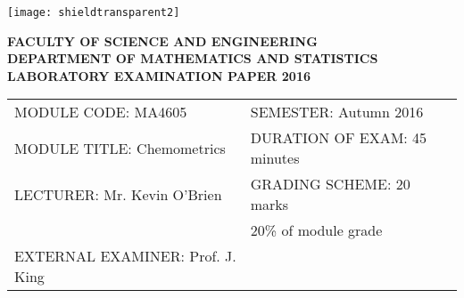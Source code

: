 \documentclass[a4paper,12pt]{article}
\begin{document}
\begin{center}
\texttt{[image: shieldtransparent2]}
\end{center}

\begin{center}
\vspace{1cm}
\large \bf {FACULTY OF SCIENCE AND ENGINEERING} \\[0.5cm]
\normalsize DEPARTMENT OF MATHEMATICS AND STATISTICS \\[1.25cm]
\large \bf {LABORATORY EXAMINATION PAPER 2016} \\[1.5cm]
\end{center}

\begin{tabular}{ll}
MODULE CODE: MA4605 & SEMESTER: Autumn 2016 \\[1cm]
MODULE TITLE: Chemometrics & DURATION OF EXAM: 45 minutes \\[1cm]
LECTURER: Mr. Kevin O'Brien & GRADING SCHEME: 20 marks \\
& \phantom{GRADING SCHEME:} \footnotesize {20\% of module grade} \\[0.8cm]
EXTERNAL EXAMINER: Prof. J. King & \\
\end{tabular}
\end{document}
